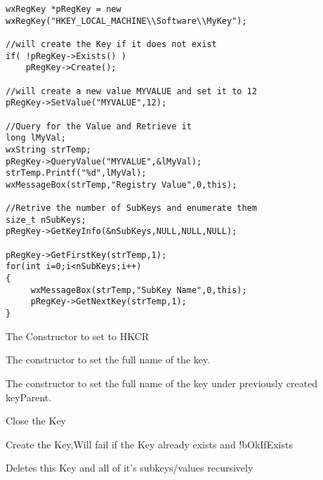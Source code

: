\begin{verbatim}
wxRegKey *pRegKey = new wxRegKey("HKEY_LOCAL_MACHINE\\Software\\MyKey");

//will create the Key if it does not exist
if( !pRegKey->Exists() )
    pRegKey->Create();

//will create a new value MYVALUE and set it to 12
pRegKey->SetValue("MYVALUE",12);

//Query for the Value and Retrieve it
long lMyVal;
wxString strTemp;
pRegKey->QueryValue("MYVALUE",&lMyVal); 
strTemp.Printf("%d",lMyVal);
wxMessageBox(strTemp,"Registry Value",0,this);

//Retrive the number of SubKeys and enumerate them
size_t nSubKeys;
pRegKey->GetKeyInfo(&nSubKeys,NULL,NULL,NULL);

pRegKey->GetFirstKey(strTemp,1);
for(int i=0;i<nSubKeys;i++)
{
     wxMessageBox(strTemp,"SubKey Name",0,this);
     pRegKey->GetNextKey(strTemp,1);
}
\end{verbatim}


\label{wxregkeyctor}


The Constructor to set to HKCR


The constructor to set the full name of the key.


The constructor to set the full name of the key under previously created keyParent.


\label{wxregkeyclose}


Close the Key


\label{wxregkeycreate}


Create the Key,Will fail if the Key already exists and !bOkIfExists


\label{wxregkeydeleteself}


Deletes this Key and all of it's subkeys/values recursively


